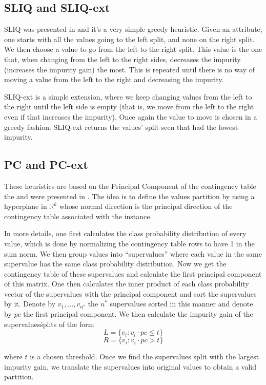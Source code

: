 \subsection{SLIQ and SLIQ-ext}
SLIQ was presented in \cite{mehta1996sliq} and it's a very simple greedy heuristic. Given an attribute, one starts with all the values going to the left split, and none on the right split. We then choose a value to go from the left to the right split. This value is the one that, when changing from the left to the right sides, decreases the impurity (increases the impurity gain) the most. This is repeated until there is no way of moving a value from the left to the right and decreasing the impurity.

SLIQ-ext is a simple extension, where we keep changing values from the left to the right until the left side is empty (that is, we move from the left to the right even if that increases the impurity). Once again the value to move is chosen in a greedy fashion. SLIQ-ext returns the values' split seen that had the lowest impurity.

\subsection{PC and PC-ext}
These heuristics are based on the Principal Component of the contingency table the and were presented in \cite{journals/datamine/CoppersmithHH99}. The idea is to define the values partition by using  a hyperplane in $\mathbb{R}^k$ whose normal  direction is the principal direction of the 
contingency table associated with the instance.

In more details, one first calculates the class probability distribution of every value, which is done by normalizing the contingency table rows to have 1 in the sum norm. We then group values into ``supervalues'' where each value in the same supervalue has the same class probability distribution. Now we get the contingency table of these supervalues and calculate the first principal component of this matrix. One then calculates the inner product of each class probability vector of the supervalues  with the principal component and sort the supervalues by it. Denote by $v_1,\ldots,v_{n^*}$ the $n^*$ supervalues sorted in this manner and denote by $pc$ the first principal component. We then calculate the impurity gain of the supervalues\' splits of the form
$$L = \{v_i : v_i \cdot pc \leq t\}$$
$$R = \{v_i : v_i \cdot pc > t\}$$

where $t$ is a chosen threshold. Once we find the supervalues split with the largest impurity gain, we translate the supervalues into original values to obtain a valid partition.

